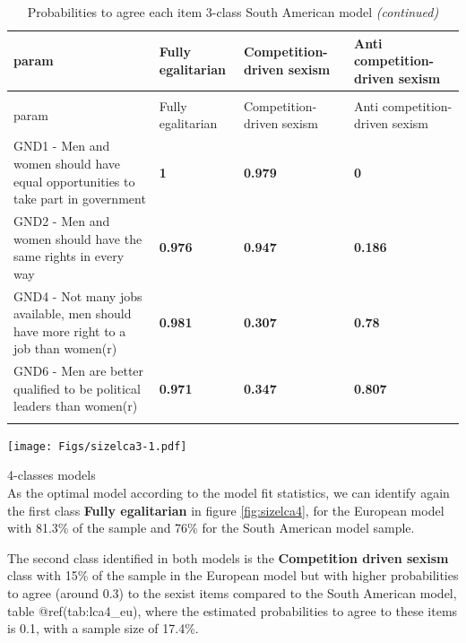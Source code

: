 \documentclass[12pt,twoside]{reedthesis}
\begin{document}
\begingroup\fontsize{9}{11}\selectfont
\begin{longtable}[l]{>{\raggedright\arraybackslash}p{20em}>{\raggedleft\arraybackslash}p{5em}>{\raggedleft\arraybackslash}p{5em}>{\raggedleft\arraybackslash}p{5em}}
\caption{\label{tab:unnamed-chunk-21}Probabilities to agree each item 3-class South American model \label{tab:lca3_la}}\\
\toprule
param & Fully egalitarian & Competition- driven sexism & Anti competition- driven sexism\\
\midrule
\endfirsthead
\caption[]{\label{tab:unnamed-chunk-21}Probabilities to agree each item 3-class South American model  \textit{(continued)}}\\
\toprule
param & Fully egalitarian & Competition- driven sexism & Anti competition- driven sexism\\
\midrule
\endhead

\endfoot
\bottomrule
\endlastfoot
GND1 - Men and women should have equal opportunities to take part in government & \textbf{\textcolor{Myblue}{1}} & \textbf{\textcolor{Myblue}{0.979}} & \textbf{\textcolor{Myred}{0}}\\
\cmidrule{1-4}\pagebreak[0]
GND2 - Men and women should have the same rights in every way & \textbf{\textcolor{Myblue}{0.976}} & \textbf{\textcolor{Myblue}{0.947}} & \textbf{\textcolor{Myred}{0.186}}\\
\cmidrule{1-4}\pagebreak[0]
GND4 - Not many jobs available, men should have more right to a job than women(r) & \textbf{\textcolor{Myblue}{0.981}} & \textbf{\textcolor{Myred}{0.307}} & \textbf{\textcolor{Mygreen}{0.78}}\\
\cmidrule{1-4}\pagebreak[0]
GND6 - Men are better qualified to be political leaders than women(r) & \textbf{\textcolor{Myblue}{0.971}} & \textbf{\textcolor{Myred}{0.347}} & \textbf{\textcolor{Myblue}{0.807}}\\*
\end{longtable}
\endgroup{}

\texttt{[image: Figs/sizelca3-1.pdf]}
\newpage  

4-classes models\\
As the optimal model according to the model fit statistics, we can identify again the first class \textbf{Fully egalitarian} in figure \ref{fig:sizelca4}, for the European model with 81.3\% of the sample and 76\% for the South American model sample.

The second class identified in both models is the \textbf{Competition driven sexism} class with 15\% of the sample in the European model but with higher probabilities to agree (around 0.3) to the sexist items compared to the South American model, table @ref(tab:lca4\_eu), where the estimated probabilities to agree to these items is 0.1, with a sample size of 17.4\%.
\end{document}
